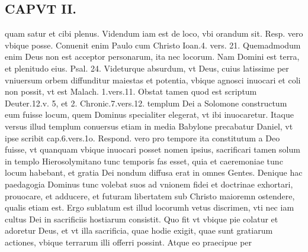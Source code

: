 \documentclass{article}
\begin{document}
\begin{pages}
\section*{CAPVT  II. }
\marginpar{[ p.67 ]}\pstart quam satur et cibi plenus. Videndum iam est de loco, vbi orandum sit. Resp. vero vbique posse. Conuenit enim Paulo cum Christo Ioan.4. vers. 21. Quemadmodum enim Deus non est acceptor personarum, ita nec locorum. Nam Domini est terra, et plenitudo eius. Psal. 24. Videturque absurdum, vt Deus, cuius latissime per vniuersum orbem diffunditur maiestas et potentia, vbique agnosci inuocari et coli non possit, vt est Malach. 1.vers.11. Obstat tamen quod est scriptum Deuter.12.v. 5, et 2. Chronic.7.vers.12. templum Dei a Solomone constructum eum fuisse locum, quem Dominus specialiter elegerat, vt ibi inuocaretur. Itaque versus illud templum conuersus etiam in media Babylone precabatur Daniel, vt ipse scribit cap.6.vers.1o. Respond. vero pro tempore ita constitutum a Deo fuisse, vt quanquam vbique inuocari posset nomen ipsius, sacrificari tamen solum in templo Hierosolymitano tunc temporis fas esset, quia et caeremoniae tunc locum habebant, et gratia Dei nondum diffusa erat in omnes Gentes. Denique hac paedagogia Dominus tunc volebat suos ad vnionem fidei et doctrinae exhortari, prouocare, et adducere, et futuram libertatem sub Christo maioremn ostendere, qualis etiam est. Ergo sublatum est illud locorumh vetus discrimen, vti nec iam cultus Dei in sacrificiis hostiarum consistit. Quo fit vt vbique pie colatur et adoretur Deus, et vt illa sacrificia, quae hodie exigit, quae sunt gratiarum actiones, vbique terrarum illi offerri possint. Atque eo praecipue per\pend

\end{pages}
\end{document}
